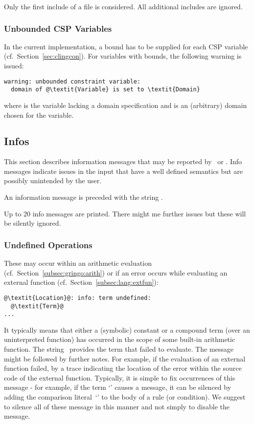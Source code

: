 \begin{note}
Only the first include of a file is considered.
All additional includes are ignored.
\end{note}

\subsubsection{Unbounded CSP Variables}\label{sec:warn:unbound}
In the current implementation, a bound has to be supplied for each CSP variable (cf.~Section~\ref{sec:clingcon}).
For variables with bounds, the following warning is issued:
\begin{lstlisting}[numbers=none,escapechar=@]
warning: unbounded constraint variable:
  domain of @\textit{Variable} is set to \textit{Domain}
\end{lstlisting}
where  is the variable lacking a domain specification
and  is an (arbitrary) domain chosen for the variable.

\subsection{Infos}\label{subsec:info}
This section describes information messages
that may be reported by \gringo\ or \clingo.
Info messages indicate issues in the input
that have a well defined semantics
but are possibly unintended by the user.

An information message is preceded with the string .

\begin{note}
Up to 20 info messages are printed.
There might me further issues but these will be silently ignored.
\end{note}

\subsubsection{Undefined Operations}\label{sec:warn:undefterm}
These may occur within an arithmetic evaluation (cf.~Section~\ref{subsec:gringo:arith})
or if an error occurs while evaluating an external function (cf.~Section~\ref{subsec:lang:extfun}):
%
\begin{lstlisting}[numbers=none,escapechar=@]
@\textit{Location}@: info: term undefined:
  @\textit{Term}@
...
\end{lstlisting}
%
It typically means that either a (symbolic) constant or a compound term (over an uninterpreted function)
has occurred in the scope of some built-in arithmetic function.
%
The string~ provides the term that failed to evaluate.
%
The message might be followed by further notes.
For example, 
if the evaluation of an external function failed,
by a trace indicating the location of the error within the source code of the external function.
%
Typically, it is simple to fix occurrences of this message
- for example, if the term `' causes a message,
it can be silenced by adding the comparison literal~`' to the body of a rule (or condition).
We suggest to silence all of these message in this manner
and not simply to disable the message.

